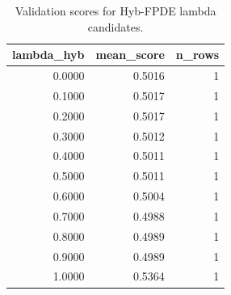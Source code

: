 \begin{table}[t]
\caption{Validation scores for Hyb-FPDE lambda candidates.}
\label{tab:lambda_distribution_computed}
\centering
\begin{tabular}{rrr}
\toprule
lambda\_hyb & mean\_score & n\_rows \\
\midrule
0.0000 & 0.5016 & 1 \\
0.1000 & 0.5017 & 1 \\
0.2000 & 0.5017 & 1 \\
0.3000 & 0.5012 & 1 \\
0.4000 & 0.5011 & 1 \\
0.5000 & 0.5011 & 1 \\
0.6000 & 0.5004 & 1 \\
0.7000 & 0.4988 & 1 \\
0.8000 & 0.4989 & 1 \\
0.9000 & 0.4989 & 1 \\
1.0000 & 0.5364 & 1 \\
\bottomrule
\end{tabular}

\end{table}
